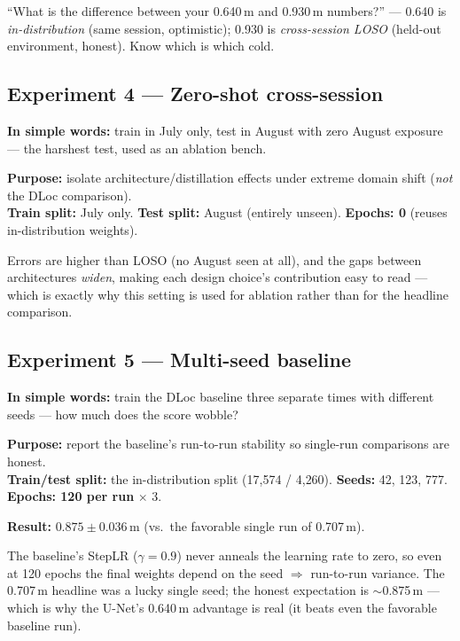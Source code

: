 \documentclass[11pt]{article}
\newcommand{\m}{\,\text{m}}
\begin{document}
\begin{defbox}
``What is the difference between your 0.640\,m and 0.930\,m numbers?'' --- 0.640 is \emph{in-distribution}
(same session, optimistic); 0.930 is \emph{cross-session LOSO} (held-out environment, honest). Know
which is which cold.
\end{defbox}

\subsection{Experiment 4 --- Zero-shot cross-session}
\textbf{In simple words:} train in July only, test in August with zero August exposure --- the harshest
test, used as an ablation bench.

\textbf{Purpose:} isolate architecture/distillation effects under extreme domain shift (\emph{not} the
DLoc comparison).\\
\textbf{Train split:} July only. \quad \textbf{Test split:} August (entirely unseen). \quad
\textbf{Epochs: 0} (reuses in-distribution weights).

\begin{whybox}
Errors are higher than LOSO (no August seen at all), and the gaps between architectures \emph{widen},
making each design choice's contribution easy to read --- which is exactly why this setting is used for
ablation rather than for the headline comparison.
\end{whybox}

\subsection{Experiment 5 --- Multi-seed baseline}
\textbf{In simple words:} train the DLoc baseline three separate times with different seeds --- how much
does the score wobble?

\textbf{Purpose:} report the baseline's run-to-run stability so single-run comparisons are honest.\\
\textbf{Train/test split:} the in-distribution split (17{,}574 / 4{,}260). \quad
\textbf{Seeds:} 42, 123, 777. \quad \textbf{Epochs: 120 per run} $\times$ 3.

\textbf{Result:} $0.875 \pm 0.036\m$ (vs.\ the favorable single run of 0.707\,m).

\begin{whybox}
The baseline's StepLR ($\gamma=0.9$) never anneals the learning rate to zero, so even at 120 epochs the
final weights depend on the seed $\Rightarrow$ run-to-run variance. The 0.707\,m headline was a lucky
single seed; the honest expectation is $\sim$0.875\,m --- which is why the U-Net's 0.640\,m advantage is
real (it beats even the favorable baseline run).
\end{whybox}
\end{document}
